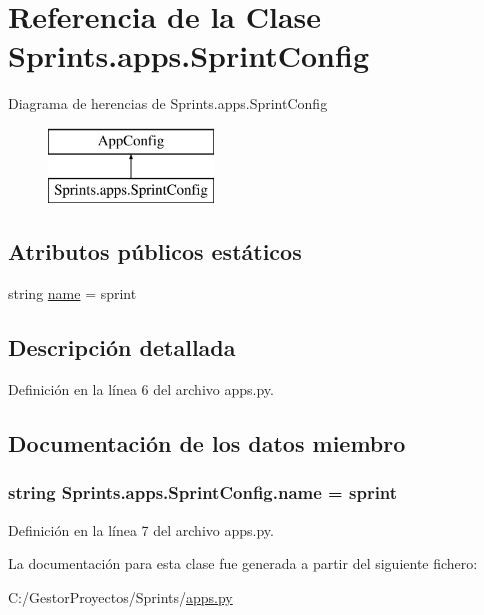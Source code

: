 \hypertarget{class_sprints_1_1apps_1_1_sprint_config}{}\section{Referencia de la Clase Sprints.\+apps.\+Sprint\+Config}
\label{class_sprints_1_1apps_1_1_sprint_config}
Diagrama de herencias de Sprints.\+apps.\+Sprint\+Config\begin{figure}[H]
\begin{center}
\leavevmode
\includegraphics[height=2.000000cm]{class_sprints_1_1apps_1_1_sprint_config}
\end{center}
\end{figure}
\subsection*{Atributos públicos estáticos}
\begin{DoxyCompactItemize}
\item 
string \hyperlink{class_sprints_1_1apps_1_1_sprint_config_a3909336f327842dd0e281e6e5cabd63b}{name} = \textquotesingle{}sprint\textquotesingle{}
\end{DoxyCompactItemize}


\subsection{Descripción detallada}


Definición en la línea 6 del archivo apps.\+py.



\subsection{Documentación de los datos miembro}
\subsubsection[{\texorpdfstring{name}{name}}]{\setlength{\rightskip}{0pt plus 5cm}string Sprints.\+apps.\+Sprint\+Config.\+name = \textquotesingle{}sprint\textquotesingle{}\hspace{0.3cm}{\ttfamily [static]}}\hypertarget{class_sprints_1_1apps_1_1_sprint_config_a3909336f327842dd0e281e6e5cabd63b}{}\label{class_sprints_1_1apps_1_1_sprint_config_a3909336f327842dd0e281e6e5cabd63b}


Definición en la línea 7 del archivo apps.\+py.



La documentación para esta clase fue generada a partir del siguiente fichero\+:\begin{DoxyCompactItemize}
\item 
C\+:/\+Gestor\+Proyectos/\+Sprints/\hyperlink{_sprints_2apps_8py}{apps.\+py}\end{DoxyCompactItemize}
